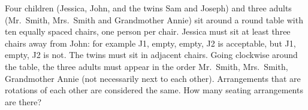 Four children (Jessica, John, and the twins Sam and Joseph) and three adults (Mr.\ Smith, Mrs.\ Smith and Grandmother Annie) sit around a round table with ten equally spaced chairs, one person per chair. Jessica must sit at least three chairs away from John: for example J1, empty, empty, J2 is acceptable, but J1, empty, J2 is not. The twins must sit in adjacent chairs. Going clockwise around the table, the three adults must appear in the order Mr.\ Smith, Mrs.\ Smith, Grandmother Annie (not necessarily next to each other). Arrangements that are rotations of each other are considered the same. How many seating arrangements are there?

